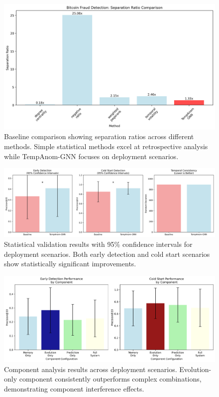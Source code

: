 \begin{figure}[htbp]
\centering
\includegraphics[width=\columnwidth]{figures/baseline_comparison.png}
\caption{Baseline comparison showing separation ratios across different methods. Simple statistical methods excel at retrospective analysis while TempAnom-GNN focuses on deployment scenarios.}
\label{fig:baseline}
\end{figure}

\begin{figure}[htbp]
\centering
\includegraphics[width=\columnwidth]{figures/statistical_validation.png}
\caption{Statistical validation results with 95\% confidence intervals for deployment scenarios. Both early detection and cold start scenarios show statistically significant improvements.}
\label{fig:statistical}
\end{figure}

\begin{figure}[htbp]
\centering
\includegraphics[width=\columnwidth]{figures/component_analysis.png}
\caption{Component analysis results across deployment scenarios. Evolution-only component consistently outperforms complex combinations, demonstrating component interference effects.}
\label{fig:components}
\end{figure}